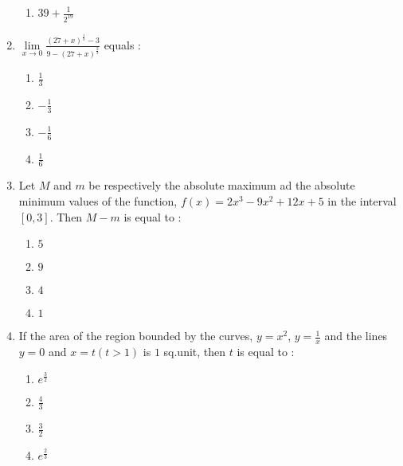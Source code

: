 \documentclass[journal,12pt,twocolumn]{IEEEtran}
\begin{document}
\begin{enumerate}[1.]
\begin{enumerate}[(1)]
\item $
39+\frac{1}{2^{19}}
$


\end{enumerate}

\item $\lim\limits_{x \to 0} \frac{(27+x)^{\frac{1}{3}}-3}{9-(27+x)^{\frac{2}{3}}} $ equals :


\begin{enumerate}[(1)]
 
\item $
\frac{1}{3}
$

\item $
-\frac{1}{3}
$

\item $
-\frac{1}{6}
$

\item $
\frac{1}{6}
$

\end{enumerate}


\item Let $M$ and $m$ be respectively the absolute maximum ad the absolute minimum values of the function, $f(x)=2x^3-9x^2+12x+5$ in the interval $[0,3]$. Then $M-m$ is equal to :

\begin{enumerate}[(1)]
 
\item $
5
$

\item $
9
$

\item $
4
$

\item $
1
$


\end{enumerate}

\item If the area of the region bounded by the curves, $y=x^2$, $y=\frac{1}{x}$ and the lines $y=0$ and $x=t(t>1)$ is $1$ sq.unit, then $t$ is equal to :

\begin{enumerate}[(1)]
 
\item $
e^{\frac{3}{2}}
$

\item $
\frac{4}{3}
$

\item $
\frac{3}{2}
$

\item $
e^\frac{2}{3}
$


\end{enumerate}


\end{enumerate}
\end{document}
